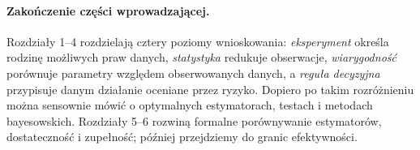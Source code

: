 \paragraph{Zakończenie części wprowadzającej.}
Rozdziały 1--4 rozdzielają cztery poziomy wnioskowania:
\emph{eksperyment} określa rodzinę możliwych praw danych,
\emph{statystyka} redukuje obserwacje,
\emph{wiarygodność} porównuje parametry względem obserwowanych danych,
a \emph{reguła decyzyjna} przypisuje danym działanie oceniane przez
ryzyko. Dopiero po takim rozróżnieniu można sensownie mówić o
optymalnych estymatorach, testach i metodach bayesowskich.
Rozdziały 5--6 rozwiną formalne porównywanie estymatorów,
dostateczność i zupełność; później przejdziemy do granic efektywności.


